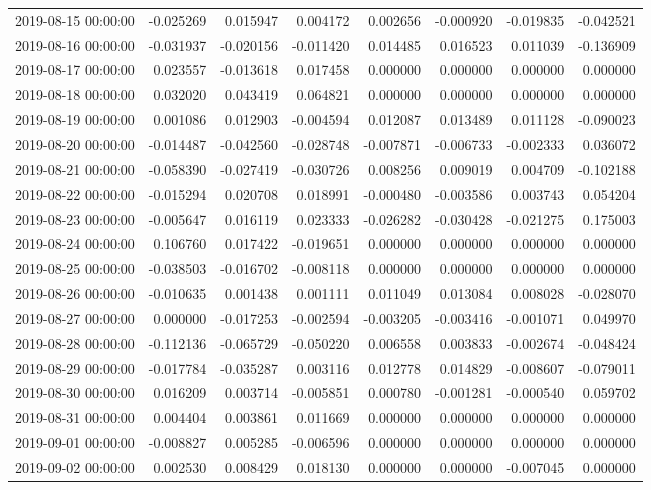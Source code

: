 \begin{tabular}{lrrrrrrr}
2019-08-15 00:00:00 & -0.025269 & 0.015947 & 0.004172 & 0.002656 & -0.000920 & -0.019835 & -0.042521 \\
2019-08-16 00:00:00 & -0.031937 & -0.020156 & -0.011420 & 0.014485 & 0.016523 & 0.011039 & -0.136909 \\
2019-08-17 00:00:00 & 0.023557 & -0.013618 & 0.017458 & 0.000000 & 0.000000 & 0.000000 & 0.000000 \\
2019-08-18 00:00:00 & 0.032020 & 0.043419 & 0.064821 & 0.000000 & 0.000000 & 0.000000 & 0.000000 \\
2019-08-19 00:00:00 & 0.001086 & 0.012903 & -0.004594 & 0.012087 & 0.013489 & 0.011128 & -0.090023 \\
2019-08-20 00:00:00 & -0.014487 & -0.042560 & -0.028748 & -0.007871 & -0.006733 & -0.002333 & 0.036072 \\
2019-08-21 00:00:00 & -0.058390 & -0.027419 & -0.030726 & 0.008256 & 0.009019 & 0.004709 & -0.102188 \\
2019-08-22 00:00:00 & -0.015294 & 0.020708 & 0.018991 & -0.000480 & -0.003586 & 0.003743 & 0.054204 \\
2019-08-23 00:00:00 & -0.005647 & 0.016119 & 0.023333 & -0.026282 & -0.030428 & -0.021275 & 0.175003 \\
2019-08-24 00:00:00 & 0.106760 & 0.017422 & -0.019651 & 0.000000 & 0.000000 & 0.000000 & 0.000000 \\
2019-08-25 00:00:00 & -0.038503 & -0.016702 & -0.008118 & 0.000000 & 0.000000 & 0.000000 & 0.000000 \\
2019-08-26 00:00:00 & -0.010635 & 0.001438 & 0.001111 & 0.011049 & 0.013084 & 0.008028 & -0.028070 \\
2019-08-27 00:00:00 & 0.000000 & -0.017253 & -0.002594 & -0.003205 & -0.003416 & -0.001071 & 0.049970 \\
2019-08-28 00:00:00 & -0.112136 & -0.065729 & -0.050220 & 0.006558 & 0.003833 & -0.002674 & -0.048424 \\
2019-08-29 00:00:00 & -0.017784 & -0.035287 & 0.003116 & 0.012778 & 0.014829 & -0.008607 & -0.079011 \\
2019-08-30 00:00:00 & 0.016209 & 0.003714 & -0.005851 & 0.000780 & -0.001281 & -0.000540 & 0.059702 \\
2019-08-31 00:00:00 & 0.004404 & 0.003861 & 0.011669 & 0.000000 & 0.000000 & 0.000000 & 0.000000 \\
2019-09-01 00:00:00 & -0.008827 & 0.005285 & -0.006596 & 0.000000 & 0.000000 & 0.000000 & 0.000000 \\
2019-09-02 00:00:00 & 0.002530 & 0.008429 & 0.018130 & 0.000000 & 0.000000 & -0.007045 & 0.000000 \\

\end{tabular}
